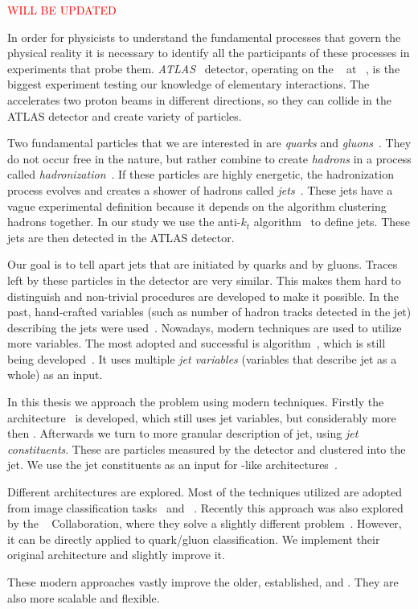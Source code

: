 
\textcolor{red}{WILL BE UPDATED}

In order for physicists to understand the fundamental processes that govern the physical reality it is necessary to identify all the participants of these processes in experiments that probe them. 
\emph{ATLAS}~\cite{ATLAS} detector, operating on the \LHC~\cite{LHC} at \CERN~\cite{cern}, is the biggest experiment testing our knowledge of elementary interactions. 
The \LHC accelerates two proton beams in different directions, so they can collide in the ATLAS detector and create variety of particles.

Two fundamental particles that we are interested in are \emph{quarks} and \emph{gluons}~\cite{quarks}.
They do not occur free in the nature, but rather combine to create \emph{hadrons} in a process called \emph{hadronization}~\cite{hadronisation}.
If these particles are highly energetic, the hadronization process evolves and creates a shower of hadrons called \emph{jets}~\cite{jet}.
These jets have a vague experimental definition because it depends on the algorithm clustering hadrons together.
In our study we use the anti-$k_t$ algorithm~\cite{antikt} to define jets.
These jets are then detected in the ATLAS detector.

Our goal is to tell apart jets that are initiated by quarks and by gluons. 
Traces left by these particles in the detector are very similar.
This makes them hard to distinguish and non-trivial procedures are developed to make it possible.
In the past, hand-crafted variables (such as number of hadron tracks detected in the jet) describing the jets were used~\cite{ntrk_tag}.
Nowadays, modern \ml techniques are used to utilize more variables.
The most adopted and successful is \bdt algorithm~\cite{bdt}, which is still being developed~\cite{bdt_tag}.
It uses multiple \emph{jet variables} (variables that describe jet as a whole) as an input.

In this thesis we approach the problem using modern \dl techniques.
Firstly the \hgn architecture~\cite{highway} is developed, which still uses jet variables, but considerably more then \bdt. 
Afterwards we turn to more granular description of jet, using \emph{jet constituents}. 
These are particles measured by the detector and clustered into the jet. 
We use the jet constituents as an input for \trans-like architectures~\cite{att_is_all}.

Different architectures are explored.
Most of the techniques utilized are adopted from image classification tasks~\cite{deit3} and \nlp~\cite{bert}.
Recently this approach was also explored by the \CMS~\cite{cms} Collaboration, where they solve a slightly different problem~\cite{part}.
However, it can be directly applied to quark/gluon classification.
We implement their original architecture and slightly improve it.

These modern approaches vastly improve the older, established, \bdt and \hgn.   
They are also more scalable and flexible.






